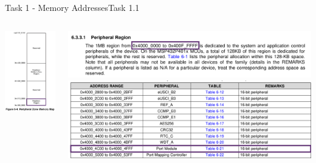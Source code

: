 \begin{frame}{Task 1 - Memory Addresses}{Task 1.1}
\begin{solution}
\begin{columns}
\begin{column}{0.4\textwidth}
        \includegraphics[height=0.5\paperheight]{./figures/peripherals_region.png}
      \end{column}
      \begin{column}{0.6\textwidth}
        \includegraphics[width=0.5\paperwidth]{./figures/system_and_application_control_peripherals.png}
        \includegraphics[width=0.5\paperwidth]{./figures/port_module.png}

\end{column}
\end{columns}
\end{solution}
\end{frame}
